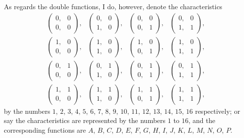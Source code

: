 \documentclass[12pt,a4paper]{article}
\theoremstyle{definition}
\begin{document}
As regards the double functions, I do, however, denote the characteristics
\[
\begin{matrix}
\begin{pmatrix} 0, & 0 \\ 0, & 0 \end{pmatrix}, &
\begin{pmatrix} 0, & 0 \\ 1, & 0 \end{pmatrix}, &
\begin{pmatrix} 0, & 0 \\ 0, & 1 \end{pmatrix}, &
\begin{pmatrix} 0, & 0 \\ 1, & 1 \end{pmatrix}, \\[1em]
\begin{pmatrix} 1, & 0 \\ 0, & 0 \end{pmatrix}, &
\begin{pmatrix} 1, & 0 \\ 1, & 0 \end{pmatrix}, &
\begin{pmatrix} 1, & 0 \\ 0, & 1 \end{pmatrix}, &
\begin{pmatrix} 1, & 0 \\ 1, & 1 \end{pmatrix}, \\[1em]
\begin{pmatrix} 0, & 1 \\ 0, & 0 \end{pmatrix}, &
\begin{pmatrix} 0, & 1 \\ 1, & 0 \end{pmatrix}, &
\begin{pmatrix} 0, & 1 \\ 0, & 1 \end{pmatrix}, &
\begin{pmatrix} 0, & 1 \\ 1, & 1 \end{pmatrix}, \\[1em]
\begin{pmatrix} 1, & 1 \\ 0, & 0 \end{pmatrix}, &
\begin{pmatrix} 1, & 1 \\ 1, & 0 \end{pmatrix}, &
\begin{pmatrix} 1, & 1 \\ 0, & 1 \end{pmatrix}, &
\begin{pmatrix} 1, & 1 \\ 1, & 1 \end{pmatrix},
\end{matrix}
\]
by the numbers $1$, $2$, $3$, $4$, $5$, $6$, $7$, $8$, $9$, $10$, $11$, $12$, $13$, $14$, $15$, $16$ respectively; or say the characteristics are represented by the numbers $1$ to $16$, and the corresponding functions are $A$, $B$, $C$, $D$, $E$, $F$, $G$, $H$, $I$, $J$, $K$, $L$, $M$, $N$, $O$, $P$.
\end{document}
